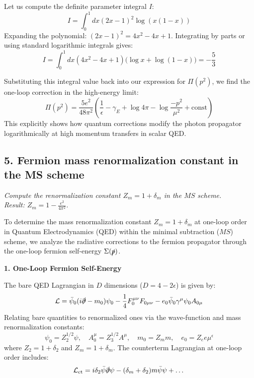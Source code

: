 Let us compute the definite parameter integral $I$:
\[
    I = \int_0^1 dx (2x - 1)^2 \log\left( x(1-x) \right)
\]
Expanding the polynomial: $(2x - 1)^2 = 4x^2 - 4x + 1$. Integrating by parts or using standard logarithmic integrals gives:
\[
    I = \int_0^1 dx (4x^2 - 4x + 1) \big( \log x + \log(1-x) \big) = -\frac{5}{3}
\]

Substituting this integral value back into our expression for $\Pi(p^2)$, we find the one-loop correction in the high-energy limit:
\[
    \Pi(p^2) = \frac{5e^2}{48\pi^2} \left( \frac{1}{\epsilon} - \gamma_E + \log 4\pi - \log \frac{-p^2}{\mu^2} + \text{const} \right)
\]
This explicitly shows how quantum corrections modify the photon propagator logarithmically at high momentum transfers in scalar QED.


\subsection*{5. Fermion mass renormalization constant in the MS scheme}

\begin{center}
    \textit{Compute the renormalization constant $Z_m = 1 + \delta_m$ in the $MS$ scheme. \\
        Result: $Z_m = 1 - \frac{e^2}{4\pi^2}$.}
\end{center}

To determine the mass renormalization constant $Z_m = 1 + \delta_m$ at one-loop order in Quantum Electrodynamics (QED) within the minimal subtraction ($MS$) scheme, we analyze the radiative corrections to the fermion propagator through the one-loop fermion self-energy $\Sigma(\slashed{p})$.

\textbf{1. One-Loop Fermion Self-Energy}

The bare QED Lagrangian in $D$ dimensions ($D = 4 - 2\epsilon$) is given by:
\[
    \mathcal{L} = \bar{\psi}_0 (i\slashed{\partial} - m_0)\psi_0 - \frac{1}{4}F_0^{\mu\nu}F_{0\mu\nu} - e_0 \bar{\psi}_0 \gamma^\mu \psi_0 A_{0\mu}
\]
Relating bare quantities to renormalized ones via the wave-function and mass renormalization constants:
\[
    \psi_0 = Z_2^{1/2} \psi, \quad A_0^\mu = Z_3^{1/2} A^\mu, \quad m_0 = Z_m m, \quad e_0 = Z_e e \mu^\epsilon
\]
where $Z_2 = 1 + \delta_2$ and $Z_m = 1 + \delta_m$. The counterterm Lagrangian at one-loop order includes:
\[
    \mathcal{L}_{\text{ct}} = i\delta_2 \bar{\psi}\slashed{\partial}\psi - (\delta_m + \delta_2) m \bar{\psi}\psi + \dots
\]


